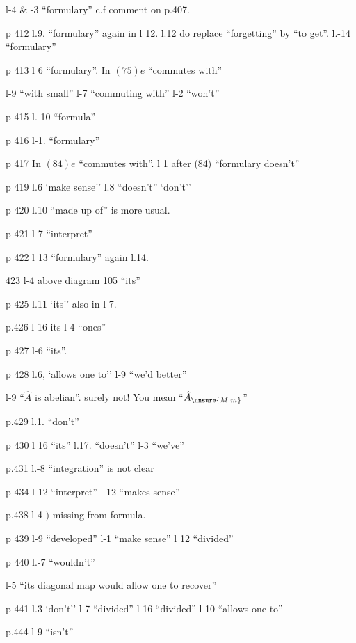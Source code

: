 l-4 \& -3 ``formulary'' c.f comment on p.407.

p 412 l.9. ``formulary'' again in l 12. \quad l.12 do replace ``forgetting'' by ``to get''. \quad l.-14 ``formulary''

p 413 l 6 ``formulary''. \quad In $(75)e$ ``commutes with''

l-9 ``with small'' \quad l-7 ``commuting with'' \quad l-2 ``won't''

p 415 l.-10 ``formula''

p 416 l-1. ``formulary''

p 417 In $(84)e$ ``commutes with''. \quad l 1 after (84) ``formulary doesn't''

p 419 l.6 `make sense'' \quad l.8 ``doesn't'' \quad `don't''

p 420 l.10 ``made up of'' is more usual.

p 421 l 7 ``interpret''

p 422 l 13 ``formulary'' again  l.14.

 423 l-4 above diagram 105 ``its''

p 425 l.11 `its'' also in l-7.

p.426 l-16 its \quad l-4 ``ones''

p 427 l-6 ``its''.

p 428 l.6, `allows one to'' \quad l-9 ``we'd better''

l-9 ``$\hat{A}$ is abelian''. surely not! You mean ``$\hat{A}_{\unsure{M|m}}$''

p.429 l.1. ``don't''

p 430 l 16 ``its'' \quad l.17. ``doesn't'' \quad l-3 ``we've''

p.431 l.-8 ``integration'' is not clear

p 434 l 12 ``interpret'' \quad l-12 ``makes sense''

p.438 l 4 \mbox{$)$} missing from formula.

p 439 l-9 ``developed'' \quad l-1 ``make sense'' \quad l 12 ``divided''

p 440 l.-7 ``wouldn't'' \quad {} \quad {}\unsure{-+|+}

l-5 ``its diagonal map would allow one to recover''

p 441 l.3 `don't'' \quad l 7 ``divided'' \quad l 16 ``divided'' \quad l-10 ``allows one to''

p.444 l-9 ``isn't''

